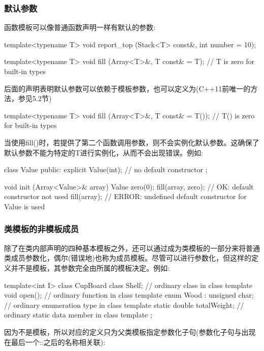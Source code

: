 \subsubsection{默认参数}

函数模板可以像普通函数声明一样有默认的参数:

\begin{cpp}
template<typename T>
void report_top (Stack<T> const&, int number = 10);

template<typename T>
void fill (Array<T>&, T const& = T{}); // T{} is zero for built-in types
\end{cpp}

后面的声明表明默认参数可以依赖于模板参数，也可以定义为(C++11前唯一的方法，参见5.2节)

\begin{cpp}
template<typename T>
void fill (Array<T>&, T const& = T()); // T() is zero for built-in types
\end{cpp}

当使用fill()时，若提供了第二个函数调用参数，则不会实例化默认参数。这确保了默认参数不能为特定的T进行实例化，从而不会出现错误。例如:

\begin{cpp}
class Value {
public:
	explicit Value(int); // no default constructor
};

void init (Array<Value>& array)
{
	Value zero(0);
	fill(array, zero); // OK: default constructor not used
	fill(array); // ERROR: undefined default constructor for Value is used
}
\end{cpp}

\subsubsection{类模板的非模板成员}

除了在类内部声明的四种基本模板之外，还可以通过成为类模板的一部分来将普通类成员参数化，偶尔(错误地)也称为成员模板。尽管可以进行参数化，但这样的定义并不是模板，其参数完全由所属的模板决定。例如:

\begin{cpp}
template<int I>
class CupBoard
{
	class Shelf; // ordinary class in class template
	void open(); // ordinary function in class template
	enum Wood : unsigned char; // ordinary enumeration type in class template
	static double totalWeight; // ordinary static data member in class template
};
\end{cpp}

因为不是模板，所以对应的定义只为父类模板指定参数化子句(参数化子句与出现在最后一个::之后的名称相关联):

